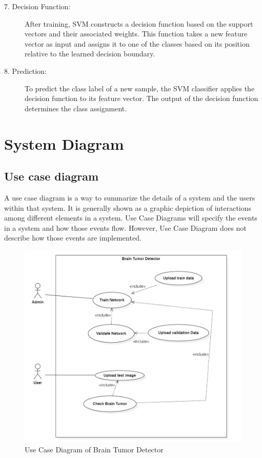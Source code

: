 \begin{description}
\begin{description}
\item[7. Decision Function:]After training, SVM constructs a decision function based on the support vectors and their associated weights. This function takes a new feature vector as input and assigns it to one of the classes based on its position relative to the learned decision boundary.
\item[8. Prediction:]To predict the class label of a new sample, the SVM classifier applies the decision function to its feature vector. The output of the decision function determines the class assignment.
\end{description}
\end{description} 
\newpage
\section{System Diagram}
\vspace{-18pt}
\subsection{Use case diagram}
\vspace{-18pt}
A use case diagram is a way to summarize the details of a system and the users within that system. It is generally shown as a graphic depiction of interactions among different elements in a system. Use Case Diagrams will specify the events in a system and how those events flow. However, Use Case Diagram does not describe how those events are implemented.
\begin{figure}[h]
\begin{center}
	\includegraphics[width=5in]{images/ucd.jpg} 
	\caption{Use Case Diagram of Brain Tumor Detector} %
	\label{Use Case Diagram of Brain Tumor Detector} %
\end{center}
\end{figure}

